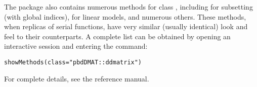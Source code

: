 The  package also contains numerous methods for class , including \code{`[`} for subsetting (with global indices),  for linear models, and numerous others.  These methods, when replicas of serial  functions, have very similar (usually identical) look and feel to their  counterparts.  A complete list can be obtained by opening an interactive  session and entering the command:
\begin{lstlisting}[language=rr]
showMethods(class="pbdDMAT::ddmatrix")
\end{lstlisting} 
For complete details, see the  reference manual.